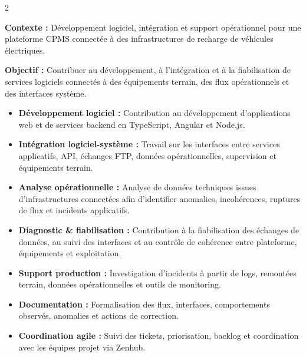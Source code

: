 \documentclass[8pt,a4paper,ragged2e,withhyper]{../_shared/altacv}
\begin{document}



\makecvheader
\vspace{-0.3cm}


\begin{paracol}{2}



\textbf{Contexte :} Développement logiciel, intégration et support opérationnel pour une plateforme CPMS connectée à des infrastructures de recharge de véhicules électriques.

\textbf{Objectif :} Contribuer au développement, à l’intégration et à la fiabilisation de services logiciels connectés à des équipements terrain, des flux opérationnels et des interfaces système.

\begin{itemize}
  \item \textbf{Développement logiciel :} Contribution au développement d’applications web et de services backend en TypeScript, Angular et Node.js.
  \item \textbf{Intégration logiciel-système :} Travail sur les interfaces entre services applicatifs, API, échanges FTP, données opérationnelles, supervision et équipements terrain.
  \item \textbf{Analyse opérationnelle :} Analyse de données techniques issues d’infrastructures connectées afin d’identifier anomalies, incohérences, ruptures de flux et incidents applicatifs.
  \item \textbf{Diagnostic \& fiabilisation :} Contribution à la fiabilisation des échanges de données, au suivi des interfaces et au contrôle de cohérence entre plateforme, équipements et exploitation.
  \item \textbf{Support production :} Investigation d’incidents à partir de logs, remontées terrain, données opérationnelles et outils de monitoring.
  \item \textbf{Documentation :} Formalisation des flux, interfaces, comportements observés, anomalies et actions de correction.
  \item \textbf{Coordination agile :} Suivi des tickets, priorisation, backlog et coordination avec les équipes projet via Zenhub.
\end{itemize}


\end{paracol}
\end{document}
